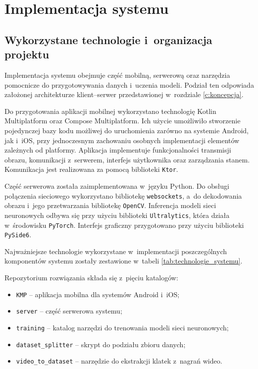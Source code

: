 \chapter{Implementacja systemu}
\label{c:implementacja}

\section{Wykorzystane technologie i~organizacja projektu}

Implementacja systemu obejmuje część mobilną, serwerową oraz narzędzia pomocnicze do przygotowywania danych i~uczenia modeli. Podział ten odpowiada założonej architekturze klient--serwer przedstawionej w~rozdziale \ref{c:koncepcja}.

Do przygotowania aplikacji mobilnej wykorzystano technologię Kotlin Multiplatform oraz Compose Multiplatform. Ich użycie umożliwiło stworzenie pojedynczej bazy kodu możliwej do uruchomienia zarówno na systemie Android, jak i~iOS, przy jednoczesnym zachowaniu osobnych implementacji elementów zależnych od platformy. Aplikacja implementuje funkcjonalności transmisji obrazu, komunikacji z~serwerem, interfejs użytkownika oraz zarządzania stanem. Komunikacja jest realizowana za pomocą biblioteki \texttt{Ktor}.

Część serwerowa została zaimplementowana w~języku Python. Do obsługi połączenia sieciowego wykorzystano bibliotekę \texttt{websockets}, a~do dekodowania obrazu i~jego przetwarzania bibliotekę \texttt{OpenCV}. Inferencja modeli sieci neuronowych odbywa się przy użyciu biblioteki \texttt{Ultralytics}, która działa w~środowisku \texttt{PyTorch}. Interfejs graficzny przygotowano przy użyciu biblioteki \texttt{PySide6}.

Najważniejsze technologie wykorzystane w~implementacji poszczególnych komponentów systemu zostały zestawione w~tabeli \ref{tab:technologie_systemu}.

Repozytorium rozwiązania składa się z~pięciu katalogów:

\begin{itemize}
    \item \texttt{KMP} -- aplikacja mobilna dla systemów Android i~iOS;
    \item \texttt{server} -- część serwerowa systemu;
    \item \texttt{training} -- katalog narzędzi do trenowania modeli sieci neuronowych;
    \item \texttt{dataset\_splitter} -- skrypt do podziału zbioru danych;
    \item \texttt{video\_to\_dataset} -- narzędzie do ekstrakcji klatek z~nagrań wideo.
\end{itemize}

